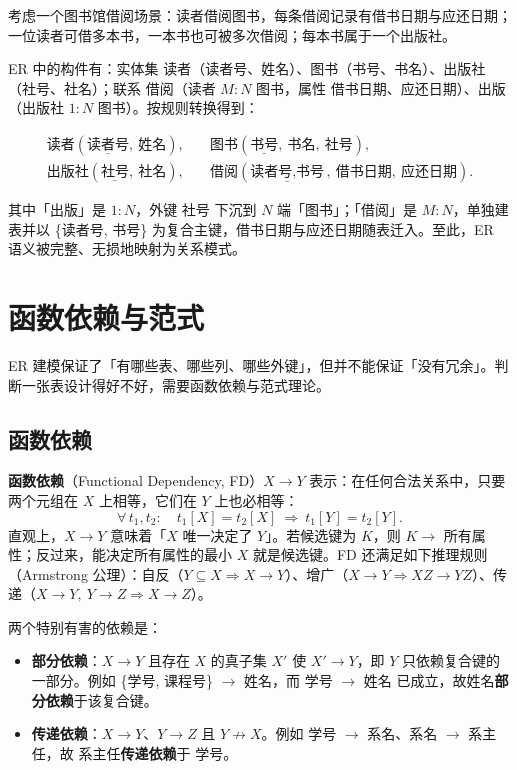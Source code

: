 考虑一个图书馆借阅场景：读者借阅图书，每条借阅记录有借书日期与应还日期；一位读者可借多本书，一本书也可被多次借阅；每本书属于一个出版社。

ER 中的构件有：实体集 读者（读者号、姓名）、图书（书号、书名）、出版社（社号、社名）；联系 借阅（读者 $M{:}N$ 图书，属性 借书日期、应还日期）、出版（出版社 $1{:}N$ 图书）。按规则转换得到：

\begin{equation}
\begin{aligned}
\text{读者}(\underline{\text{读者号}},\ \text{姓名}),\quad
& \text{图书}(\underline{\text{书号}},\ \text{书名},\ \textit{社号}),\\
\text{出版社}(\underline{\text{社号}},\ \text{社名}),\quad
& \text{借阅}(\underline{\text{读者号},\text{书号}},\ \text{借书日期},\ \text{应还日期}).
\end{aligned}
\end{equation}

其中「出版」是 $1{:}N$，外键 社号 下沉到 $N$ 端「图书」；「借阅」是 $M{:}N$，单独建表并以 \{读者号, 书号\} 为复合主键，借书日期与应还日期随表迁入。至此，ER 语义被完整、无损地映射为关系模式。

\section{函数依赖与范式}

ER 建模保证了「有哪些表、哪些列、哪些外键」，但并不能保证「没有冗余」。判断一张表设计得好不好，需要函数依赖与范式理论。

\subsection{函数依赖}

\textbf{函数依赖}（Functional Dependency, FD）$X \to Y$ 表示：在任何合法关系中，只要两个元组在 $X$ 上相等，它们在 $Y$ 上也必相等：
\begin{equation}
\forall\,t_1,t_2:\quad t_1[X]=t_2[X]\ \Longrightarrow\ t_1[Y]=t_2[Y].
\end{equation}
直观上，$X \to Y$ 意味着「$X$ 唯一决定了 $Y$」。若候选键为 $K$，则 $K \to$ 所有属性；反过来，能决定所有属性的最小 $X$ 就是候选键。FD 还满足如下推理规则（Armstrong 公理）：自反（$Y \subseteq X \Rightarrow X \to Y$）、增广（$X \to Y \Rightarrow XZ \to YZ$）、传递（$X \to Y,\ Y \to Z \Rightarrow X \to Z$）。

两个特别有害的依赖是：

\begin{itemize}
    \item \textbf{部分依赖}：$X \to Y$ 且存在 $X$ 的真子集 $X'$ 使 $X' \to Y$，即 $Y$ 只依赖复合键的一部分。例如 \{学号, 课程号\} $\to$ 姓名，而 学号 $\to$ 姓名 已成立，故姓名\textbf{部分依赖}于该复合键。
    \item \textbf{传递依赖}：$X \to Y$、$Y \to Z$ 且 $Y \not\to X$。例如 学号 $\to$ 系名、系名 $\to$ 系主任，故 系主任\textbf{传递依赖}于 学号。
\end{itemize}

